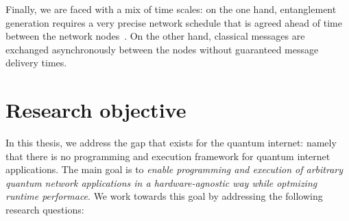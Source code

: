 
Finally, we are faced with a mix of time scales: on the one hand, entanglement generation requires a very precise network schedule that is agreed ahead of time between the network nodes~\cite{dahlberg2019link}.
On the other hand, classical messages are exchanged asynchronously between the nodes without guaranteed message delivery times.




\section{Research objective}
In this thesis, we address the gap that exists for the quantum internet: namely that there is no programming and execution framework for quantum internet applications.
The main goal is to \emph{enable programming and execution of arbitrary quantum network applications in a hardware-agnostic way while optmizing runtime performace}.
We work towards this goal by addressing the following research questions:


